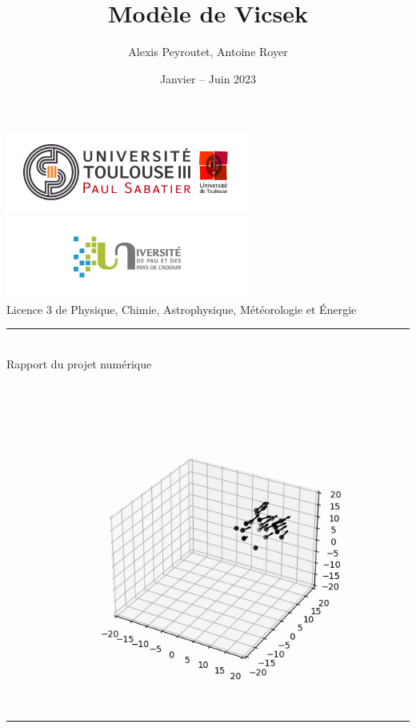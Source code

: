\documentclass[french, a4paper, 12pt, openany]{report}
\title{\sc Modèle de Vicsek}
\author{Alexis Peyroutet, Antoine Royer}
\date{Janvier – Juin 2023}
\begin{document}
\makeatletter
\begin{titlepage}
	\centering
	
	\includegraphics[width=8cm]{images/ut3.png} \hfill \includegraphics[width=8cm]{images/uppa.png} \\
	{\large{\sc Licence 3 de Physique, Chimie, Astrophysique, Météorologie et Énergie}} \\
	\rule{0.5\linewidth}{0.4pt} \\
	{\sc Rapport du projet numérique} \\
	
	
	\vfill
	{\huge {\sc \@title}} \\ \vspace{1cm}
	{\Large \@author} \\
	
	\vfill 
	\includegraphics[width=0.7\linewidth]{images/page_garde2.png}
	\vfill
	{\Large \@date}
	\rule{\linewidth}{0.4pt}
\end{titlepage}
\makeatother

\tableofcontents

\end{document}
